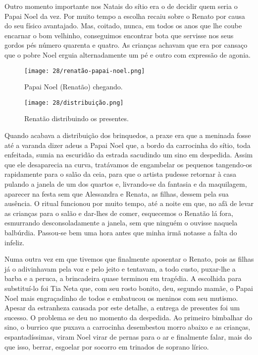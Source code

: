 Outro momento importante nos Natais do sítio era o de decidir quem seria o Papai Noel da vez.
Por muito tempo a escolha recaiu sobre o Renato por causa do seu físico avantajado.
Mas, coitado, nunca, em todos os anos que lhe coube encarnar o bom velhinho, conseguimos encontrar bota que servisse nos seus gordos pés número quarenta e quatro.
As crianças achavam que era por cansaço que o pobre Noel erguia alternadamente um pé e outro com expressão de agonia.


\begin{figure}
\centering
\texttt{[image: 28/renatão-papai-noel.png]}
\caption{Papai Noel (Renatão) chegando.}
\end{figure}

\begin{figure}
\centering
\texttt{[image: 28/distribuição.png]}
\caption{Renatão distribuindo os presentes.}
\end{figure}


Quando acabava a distribuição dos brinquedos, a praxe era que a meninada fosse até a varanda dizer adeus a Papai Noel que, a bordo da carrocinha do sítio, toda enfeitada, sumia na escuridão da estrada sacudindo um sino em despedida.
Assim que ele desaparecia na curva, tratávamos de engambelar os pequenos tangendo-os rapidamente para o salão da ceia, para que o artista pudesse retornar à casa pulando a janela de um dos quartos e, livrando-se da fantasia e da maquilagem, aparecer na festa sem que Alessandra e Renata, as filhas, dessem pela sua ausência.
O ritual funcionou por muito tempo, até a noite em que, no afã de levar as crianças para o salão e dar-lhes de comer, esquecemos o Renatão lá fora, esmurrando desconsoladamente a janela, sem que ninguém o ouvisse naquela balbúrdia.
Passou-se bem uma hora antes que minha irmã notasse a falta do infeliz.

Numa outra vez em que tivemos que finalmente aposentar o Renato, pois as filhas já o adivinhavam pela voz e pelo jeito e tentavam, a todo custo, puxar-lhe a barba e a peruca, a brincadeira quase terminou em tragédia.
A escolhida para substituí-lo foi Tia Neta que, com seu rosto bonito, deu, segundo mamãe, o Papai Noel mais engraçadinho de todos e embatucou os meninos com seu mutismo.
Apesar da estranheza causada por este detalhe, a entrega de presentes foi um sucesso.
O problema se deu no momento da despedida.
Ao primeiro bimbalhar do sino, o burrico que puxava a carrocinha desembestou morro abaixo e as crianças, espantadíssimas, viram Noel virar de pernas para o ar e finalmente falar, mais do que isso, berrar, esgoelar por socorro em trinados de soprano lírico.

